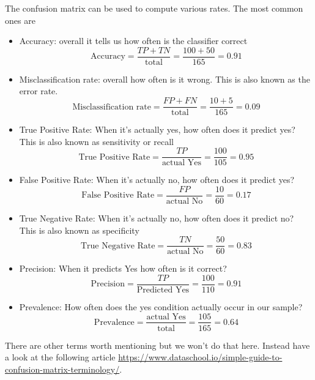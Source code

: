 The confusion matrix can be used to compute various rates. The most common ones are

\begin{itemize}
\item Accuracy: overall it tells us how often is the classifier correct
\begin{equation}
\text{Accuracy} = \frac{TP + TN}{\text{total}} = \frac{100 + 50}{165} = 0.91
\end{equation}
\item Misclassification rate: overall how often is it wrong. This is also known as the error rate.
\begin{equation}
\text{Misclassification rate} = \frac{FP + FN}{\text{total}} = \frac{10 + 5}{165} = 0.09
\end{equation}
\item True Positive Rate: When it's actually yes, how often does it predict yes? This is also known as sensitivity or recall
\begin{equation}
\text{True Positive Rate} = \frac{TP}{\text{actual Yes}} = \frac{100}{105} = 0.95
\end{equation}
\item False Positive Rate: When it's actually no, how often does it predict yes? 
\begin{equation}
\text{False Positive Rate} = \frac{FP}{\text{actual No}}= \frac{10}{60} = 0.17
\end{equation}
\item True Negative Rate: When it's actually no, how often does it predict no? This is also known as specificity
\begin{equation}
\text{True Negative Rate} = \frac{TN}{\text{actual No}} = \frac{50}{60} = 0.83
\end{equation}
\item Precision: When it predicts Yes how often is it correct?
\begin{equation}
\text{Precision} = \frac{TP}{\text{Predicted Yes}} = \frac{100}{110} = 0.91
\end{equation}
\item Prevalence: How often does the yes condition actually occur in our sample?
\begin{equation}
\text{Prevalence} = \frac{\text{actual Yes}}{\text{total}} = \frac{105}{165} = 0.64
\end{equation}
\end{itemize}

There are other terms worth mentioning but we won't do that here. Instead have a look at 
the following article \url{https://www.dataschool.io/simple-guide-to-confusion-matrix-terminology/}.

